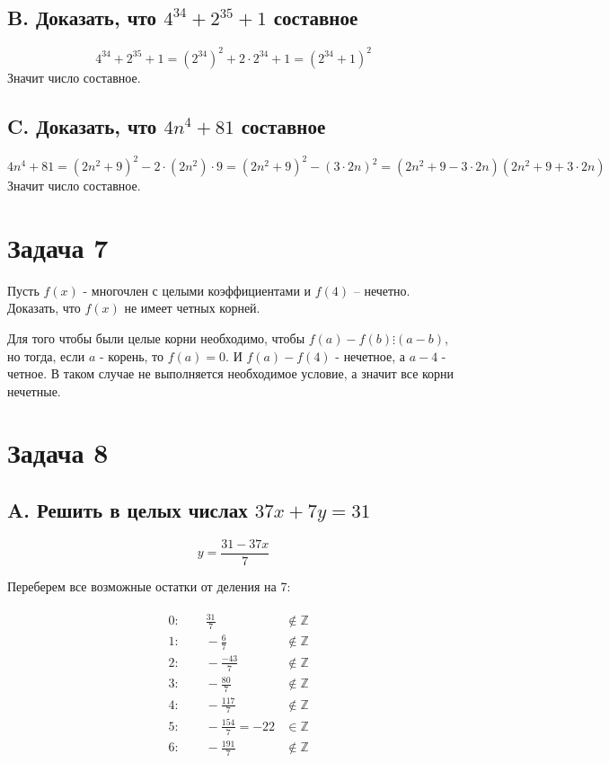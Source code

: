 \documentclass[a4paper,12pt]{article}
\begin{document}
\subsection*{B. Доказать, что $ 4^{34} + 2^{35} +1 $ составное}
$$  4^{34} + 2^{35} +1 = (2^{34})^2 + 2\cdot 2^{34} + 1 = (2^{34} + 1)^2  $$
Значит число составное.

\subsection*{C. Доказать, что $ 4n^4 + 81 $ составное}
$$ 4n^4 + 81 = (2n^2 + 9)^2 - 2\cdot (2n^2)\cdot 9 = (2n^2 + 9)^2 - (3\cdot 2n)^2 = (2n^2+9-3\cdot 2n)(2n^2+9+3\cdot 2n) $$
Значит число составное.

\section*{Задача 7}
Пусть $f(x)$ - многочлен с целыми коэффициентами и $f(4)$ – нечетно. Доказать, что $f(x)$ не имеет четных корней.

Для того чтобы были целые корни необходимо, чтобы $f(a) - f(b) \vdots (a-b)$, но тогда, если $a$ - корень, то $f(a) = 0$. И $ f(a) - f(4)$ - нечетное, а $ a-4 $ - четное. В таком случае не выполняется необходимое условие, а значит все корни нечетные.

\section*{Задача 8}
\subsection*{A. Решить в целых числах $37x + 7y =31$}
$$ y = \frac{31-37x}{7} $$

Переберем все возможные остатки от деления на 7:

\begin{gather*}
    \begin{aligned}
        & 0: \qquad \frac{31}{7} & \notin \mathbb{Z} \\
        & 1: \qquad -\frac{6}{7} & \notin \mathbb{Z} \\
        & 2: \qquad -\frac{-43}{7} & \notin \mathbb{Z} \\
        & 3: \qquad -\frac{80}{7} & \notin \mathbb{Z} \\
        & 4: \qquad -\frac{117}{7} & \notin \mathbb{Z} \\
        & 5: \qquad -\frac{154}{7} = -22 & \in \mathbb{Z} \\
        & 6: \qquad -\frac{191}{7} & \notin \mathbb{Z} \\
    \end{aligned}
\end{gather*}
\end{document}
